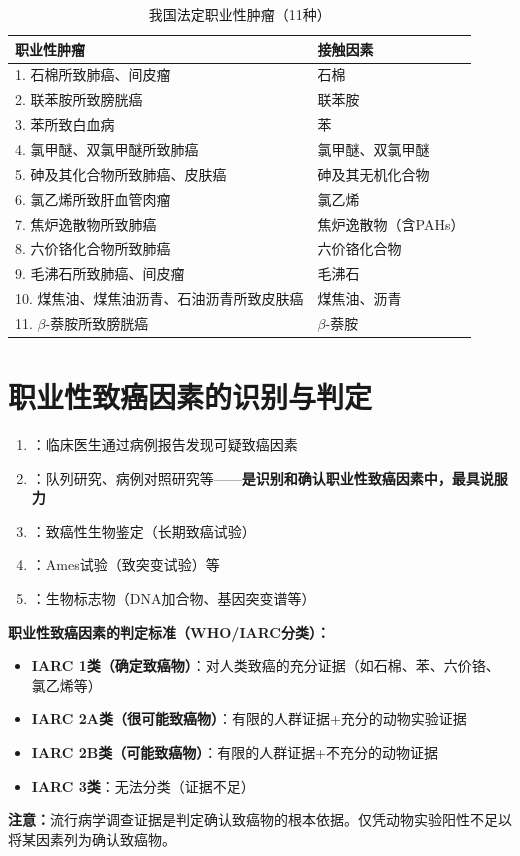 \begin{keybox}
\begin{table}[H]
\centering
\caption{我国法定职业性肿瘤（11种）}
\begin{tabularx}{\textwidth}{ll}
\hline
\textbf{职业性肿瘤} & \textbf{接触因素} \\
\hline
1. 石棉所致肺癌、间皮瘤 & 石棉 \\
2. 联苯胺所致膀胱癌 & 联苯胺 \\
3. 苯所致白血病 & 苯 \\
4. 氯甲醚、双氯甲醚所致肺癌 & 氯甲醚、双氯甲醚 \\
5. 砷及其化合物所致肺癌、皮肤癌 & 砷及其无机化合物 \\
6. 氯乙烯所致肝血管肉瘤 & 氯乙烯 \\
7. 焦炉逸散物所致肺癌 & 焦炉逸散物（含PAHs）\\
8. 六价铬化合物所致肺癌 & 六价铬化合物 \\
9. 毛沸石所致肺癌、间皮瘤 & 毛沸石 \\
10. 煤焦油、煤焦油沥青、石油沥青所致皮肤癌 & 煤焦油、沥青 \\
11. $\beta$-萘胺所致膀胱癌 & $\beta$-萘胺 \\
\hline
\end{tabularx}
\end{table}
\end{keybox}

\section{职业性致癌因素的识别与判定}

\begin{enumerate}[leftmargin=*]
    \item {}：临床医生通过病例报告发现可疑致癌因素
    \item {}：队列研究、病例对照研究等——\textbf{是识别和确认职业性致癌因素中，最具说服力}
    \item {}：致癌性生物鉴定（长期致癌试验）
    \item {}：Ames试验（致突变试验）等
    \item {}：生物标志物（DNA加合物、基因突变谱等）
\end{enumerate}

\begin{tipbox}
\textbf{职业性致癌因素的判定标准（WHO/IARC分类）：}
\begin{itemize}[leftmargin=*]
    \item \textbf{IARC 1类（确定致癌物）}：对人类致癌的充分证据（如石棉、苯、六价铬、氯乙烯等）
    \item \textbf{IARC 2A类（很可能致癌物）}：有限的人群证据+充分的动物实验证据
    \item \textbf{IARC 2B类（可能致癌物）}：有限的人群证据+不充分的动物证据
    \item \textbf{IARC 3类}：无法分类（证据不足）
\end{itemize}
\textbf{注意：}流行病学调查证据是判定确认致癌物的根本依据。仅凭动物实验阳性不足以将某因素列为确认致癌物。
\end{tipbox}

